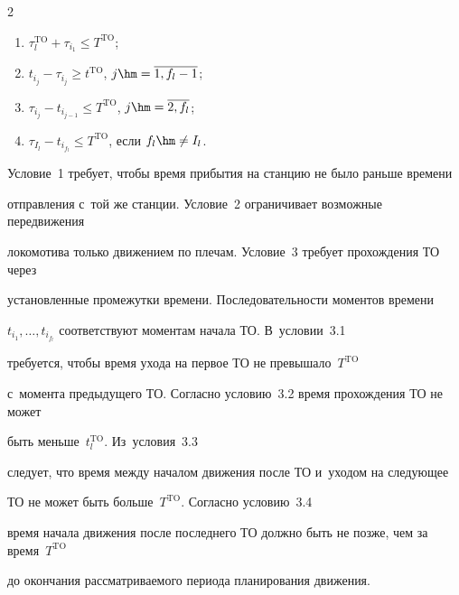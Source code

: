 \begin{multicols}{2}
\begin{enumerate}[(1)]
\begin{enumerate}[({3}.1)]
\item $\tau^{\mathrm{TO}}_l + \tau_{i_1} \leqslant T^{\mathrm{TO}}$;


    


     \item $t_{i_j}-\tau_{i_j} \geqslant t^{\mathrm{TO}}$, $j\hm=\overline{1, f_l-1}$;


    


        \item $\tau_{i_j} - t_{i_{j-1}} \leqslant T^{\mathrm{TO}}$, $j\hm=\overline{2, f_l}$;


    


        \item $\tau_{I_l} - t_{i_{f_l}} \leqslant T^{\mathrm{TO}}$, если $f_l\hm\ne I_l$.


        


\end{enumerate}


\end{enumerate}





Условие~1 требует, чтобы время прибытия на станцию не было раньше времени 


отправления с~той же станции. Условие~2 ограничивает возможные передвижения 


локомотива только движением по плечам. Условие~3 требует прохождения ТО через 


установленные промежутки времени. Последовательности моментов времени 


$t_{i_1}, \ldots, t_{i_{f_l}}$ соответствуют моментам начала ТО. В~условии~3.1 


требуется, чтобы время ухода на первое ТО не превышало~$T^{\mathrm{TO}}$ 


с~момента предыдущего ТО. Согласно условию~3.2 время прохождения ТО не может 


быть меньше~$t^{\mathrm{TO}}_l$. Из~условия~3.3 


следует, что время между началом движения после ТО и~уходом на сле\-ду\-ющее 


ТО не может быть больше~$T^{\mathrm{TO}}$. Согласно условию~3.4 


время начала движения после последнего ТО должно быть не позже, чем за время~$T^{\mathrm{TO}}$ 


до окончания рассматриваемого периода планирования движения.






\end{multicols}
